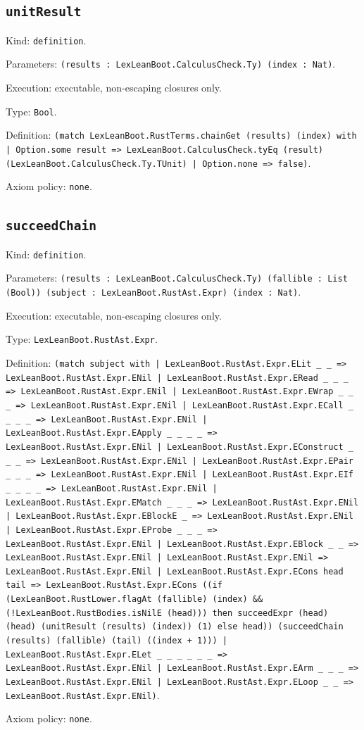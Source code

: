 \documentclass[11pt]{article}
\begin{document}
\subsection*{\texttt{unitResult}}
\noindent Kind: \texttt{definition}.\par
\noindent Parameters: \texttt{(results : LexLeanBoot.CalculusCheck.Ty) (index : Nat)}.\par
\noindent Execution: executable, non-escaping closures only.\par
\noindent Type: \texttt{Bool}.\par
\noindent Definition: \texttt{(match LexLeanBoot.RustTerms.chainGet (results) (index) with | Option.some result => LexLeanBoot.CalculusCheck.tyEq (result) (LexLeanBoot.CalculusCheck.Ty.TUnit) | Option.none => false)}.\par
\noindent Axiom policy: \texttt{none}.\par
\subsection*{\texttt{succeedChain}}
\noindent Kind: \texttt{definition}.\par
\noindent Parameters: \texttt{(results : LexLeanBoot.CalculusCheck.Ty) (fallible : List (Bool)) (subject : LexLeanBoot.RustAst.Expr) (index : Nat)}.\par
\noindent Execution: executable, non-escaping closures only.\par
\noindent Type: \texttt{LexLeanBoot.RustAst.Expr}.\par
\noindent Definition: \texttt{(match subject with | LexLeanBoot.RustAst.Expr.ELit \_ \_ => LexLeanBoot.RustAst.Expr.ENil | LexLeanBoot.RustAst.Expr.ERead \_ \_ \_ => LexLeanBoot.RustAst.Expr.ENil | LexLeanBoot.RustAst.Expr.EWrap \_ \_ \_ => LexLeanBoot.RustAst.Expr.ENil | LexLeanBoot.RustAst.Expr.ECall \_ \_ \_ \_ => LexLeanBoot.RustAst.Expr.ENil | LexLeanBoot.RustAst.Expr.EApply \_ \_ \_ \_ => LexLeanBoot.RustAst.Expr.ENil | LexLeanBoot.RustAst.Expr.EConstruct \_ \_ \_ => LexLeanBoot.RustAst.Expr.ENil | LexLeanBoot.RustAst.Expr.EPair \_ \_ \_ => LexLeanBoot.RustAst.Expr.ENil | LexLeanBoot.RustAst.Expr.EIf \_ \_ \_ \_ => LexLeanBoot.RustAst.Expr.ENil | LexLeanBoot.RustAst.Expr.EMatch \_ \_ \_ => LexLeanBoot.RustAst.Expr.ENil | LexLeanBoot.RustAst.Expr.EBlockE \_ => LexLeanBoot.RustAst.Expr.ENil | LexLeanBoot.RustAst.Expr.EProbe \_ \_ \_ => LexLeanBoot.RustAst.Expr.ENil | LexLeanBoot.RustAst.Expr.EBlock \_ \_ => LexLeanBoot.RustAst.Expr.ENil | LexLeanBoot.RustAst.Expr.ENil => LexLeanBoot.RustAst.Expr.ENil | LexLeanBoot.RustAst.Expr.ECons head tail => LexLeanBoot.RustAst.Expr.ECons ((if (LexLeanBoot.RustLower.flagAt (fallible) (index) \&\& (!LexLeanBoot.RustBodies.isNilE (head))) then succeedExpr (head) (head) (unitResult (results) (index)) (1) else head)) (succeedChain (results) (fallible) (tail) ((index + 1))) | LexLeanBoot.RustAst.Expr.ELet \_ \_ \_ \_ \_ \_ => LexLeanBoot.RustAst.Expr.ENil | LexLeanBoot.RustAst.Expr.EArm \_ \_ \_ => LexLeanBoot.RustAst.Expr.ENil | LexLeanBoot.RustAst.Expr.ELoop \_ \_ => LexLeanBoot.RustAst.Expr.ENil)}.\par
\noindent Axiom policy: \texttt{none}.\par
\end{document}
